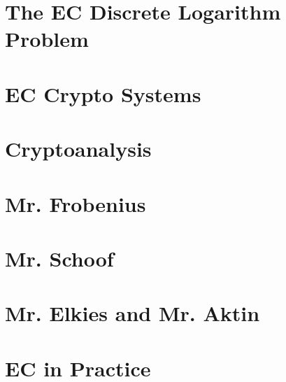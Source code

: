 \documentclass[tikz]{scrreprt}
\begin{document}
\section{The EC Discrete Logarithm Problem} 
\section{EC Crypto Systems} 
\section{Cryptoanalysis} 
\section{Mr. Frobenius} 
\section{Mr. Schoof} 
\section{Mr. Elkies and Mr. Aktin} 
\section{EC in Practice} 
\end{document}
